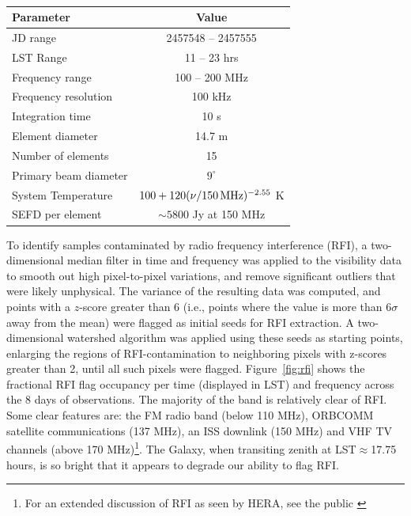 \documentclass[twocolumn, trackchanges]{aastex61}
\begin{document}
\begin{table}
\centering
\caption{}
\begin{tabular}{lc}
\hline
Parameter & Value \\
\hline
JD range & 2457548 -- 2457555 \\
LST Range & 11 -- 23 hrs \\
Frequency range & 100 -- 200 MHz \\
Frequency resolution & 100 kHz \\
Integration time & 10 s\\
Element diameter & 14.7 m\\
Number of elements & 15 \\
Primary beam diameter & $9^{\circ}$ \\
System Temperature & $100 + 120(\nu / 150\,{\rm MHz})^{-2.55}$ K\\
SEFD per element & $\sim 5800$ Jy at 150 MHz\\
\hline
\end{tabular}
\label{tab:params}
\end{table}


To identify samples contaminated by radio frequency interference (RFI), a two-dimensional median filter in time and frequency was applied to the visibility data to smooth out high pixel-to-pixel variations, and remove significant outliers that were likely unphysical. The variance of the resulting data was computed, and points with a $z$-score greater than 6 (i.e., points where the value is more than 6$\sigma$ away from the mean) were flagged as initial seeds for RFI extraction. A two-dimensional watershed algorithm was applied using these seeds as starting points, enlarging the regions of RFI-contamination to neighboring pixels with z-scores greater than 2, until all such pixels were flagged. Figure~\ref{fig:rfi} shows the fractional RFI flag occupancy per time (displayed in LST) and frequency across the 8 days of observations. The majority of the band is relatively clear of RFI. Some clear features are: the FM radio band (below 110 MHz), ORBCOMM satellite communications (137 MHz), an ISS downlink (150 MHz) and VHF TV channels (above 170 MHz)\footnote{For an extended discussion of RFI as seen by HERA, see the public \href{http://reionization.org/wp-content/uploads/2013/03/HERAMemo19_HERA_dish_RFI.pdf}{}}.
The Galaxy, when transiting zenith at LST$\approx$17.75 hours, is so bright that it appears to degrade our ability to flag RFI.
\end{document}
